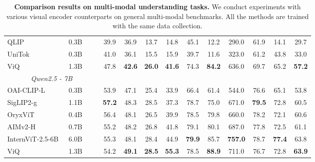 \documentclass{llmxive}
\begin{document}
\begin{table}[t]
\begin{adjustbox}{width=\linewidth}
\begin{tabular}{lccccccccccccc}
    \midrule
    QLIP~\cite{zhao2025qlip}  &   0.3B    &     &      &39.9 &	36.9 &	13.7 &	14.8 &	45.1 &	12.2 &	290.0 &	61.9 	&14.1 &	29.7 \\
    UniTok~\cite{ma2025unitok} &   0.3B    &        &     &  41.0 &	36.1 &	15.5 	&15.9 &	39.7 &	11.6 	&323.0 &	61.2 &	43.8 &33.0  \\
    \midrule
    \rowcolor{red!10} ViQ & 1.3B  &        &        & 47.8  & \textbf{42.6}  & \textbf{26.0}  & \textbf{41.6}  & 74.3  & \textbf{84.2}  & 636.0  & 69.7  & 65.2  & \textbf{57.2}\\
    \midrule
    \multicolumn{4}{c}{\textit{Qwen2.5 - 7B}} \\
    \midrule
    OAI-CLIP-L~\cite{radford2021clip} &    0.3B   &        &        & 53.9 & 	47.1 & 	25.4 & 	33.9 	& 66.4 	& 61.4 & 	544.0 & 	76.6 & 	65.1 	& 53.8 \\
    SigLIP2-g~\cite{tschannen2025siglip} & 1.1B    &     &        & \textbf{57.2} &	48.3 &	28.5 &	37.3 &	78.7 &	75.0 	&671.0 &	\textbf{79.5} &	72.8 &	60.5   \\
    \midrule
    OryxViT~\cite{liu2024oryx} & 0.4B &        &        &   56.4    &    48.1   &   26.5    &   39.9    &   78.5   &  79.8  &    660.0   &  78.2     &   72.1      & 60.6  \\
    AIMv2-H~\cite{fini2025multimodal} &    0.7B    &      &        & 55.2 &	48.2 &	26.8 &	41.8 &	79.1 &	80.1 	&687.0 	&77.8 &	72.5 &	61.1 \\
    InternViT-2.5-6B~\cite{chen2412expanding} &   6.0B     &      &        & 55.3 &	48.1 &	28.4 &	44.9 &	\textbf{79.9} &	85.7 &	\textbf{757.0} &	78.7 &	\textbf{77.4} 	&63.8 \\
    \midrule
    \rowcolor{red!10} ViQ & 1.3B  &       &        & 54.2  & \textbf{49.1}  & \textbf{28.5}  & \textbf{55.3}  & 78.5  & \textbf{88.9}  & 711.0   & 76.7  & 72.8  & \textbf{63.9}  \\
    \bottomrule
    \end{tabular}
  \end{adjustbox}
  \label{tab:multimodal}
\caption{\textbf{Comparison results on multi-modal understanding tasks.} We conduct experiments with various visual encoder counterparts on general multi-modal benchmarks. All the methods are trained with the same data collection.}
\end{table}
\end{document}
